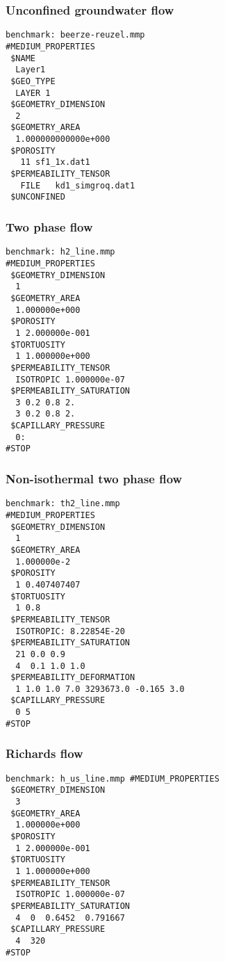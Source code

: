 {%
\subsubsection{Unconfined groundwater flow}

\begin{verbatim}
benchmark: beerze-reuzel.mmp
#MEDIUM_PROPERTIES
 $NAME
  Layer1
 $GEO_TYPE
  LAYER 1
 $GEOMETRY_DIMENSION
  2
 $GEOMETRY_AREA
  1.000000000000e+000
 $POROSITY
   11 sf1_1x.dat1
 $PERMEABILITY_TENSOR
   FILE   kd1_simgroq.dat1
 $UNCONFINED
\end{verbatim}

\subsubsection{Two phase flow}

\begin{verbatim}
benchmark: h2_line.mmp
#MEDIUM_PROPERTIES
 $GEOMETRY_DIMENSION
  1
 $GEOMETRY_AREA
  1.000000e+000
 $POROSITY
  1 2.000000e-001
 $TORTUOSITY
  1 1.000000e+000
 $PERMEABILITY_TENSOR
  ISOTROPIC 1.000000e-07
 $PERMEABILITY_SATURATION
  3 0.2 0.8 2.
  3 0.2 0.8 2.
 $CAPILLARY_PRESSURE
  0:
#STOP
\end{verbatim}

\subsubsection{Non-isothermal two phase flow}

\begin{verbatim}
benchmark: th2_line.mmp
#MEDIUM_PROPERTIES
 $GEOMETRY_DIMENSION
  1
 $GEOMETRY_AREA
  1.000000e-2
 $POROSITY
  1 0.407407407
 $TORTUOSITY
  1 0.8
 $PERMEABILITY_TENSOR
  ISOTROPIC: 8.22854E-20
 $PERMEABILITY_SATURATION
  21 0.0 0.9
  4  0.1 1.0 1.0
 $PERMEABILITY_DEFORMATION
  1 1.0 1.0 7.0 3293673.0 -0.165 3.0
 $CAPILLARY_PRESSURE
  0 5
#STOP
\end{verbatim}


\subsubsection{Richards flow}
\begin{verbatim}
benchmark: h_us_line.mmp #MEDIUM_PROPERTIES
 $GEOMETRY_DIMENSION
  3
 $GEOMETRY_AREA
  1.000000e+000
 $POROSITY
  1 2.000000e-001
 $TORTUOSITY
  1 1.000000e+000
 $PERMEABILITY_TENSOR
  ISOTROPIC 1.000000e-07
 $PERMEABILITY_SATURATION
  4  0  0.6452  0.791667
 $CAPILLARY_PRESSURE
  4  320
#STOP
\end{verbatim}

}
